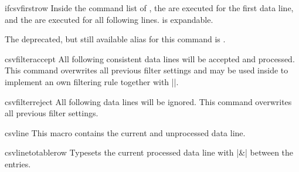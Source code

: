 \documentclass[a4paper,11pt]{ltxdoc}
\begin{document}
\clearpage

\begin{docCommand}[doc updated=2021-06-28]{ifcsvfirstrow}{}
  Inside the command list of , the 
  are executed for the first data line, and the 
  are executed for all following lines.
   is expandable.
\begin{dispExample}
\end{dispExample}
  The deprecated, but still available alias for this command is
  .
\end{docCommand}

\medskip


\begin{docCommand}{csvfilteraccept}{}
  All following consistent data lines will be accepted and processed.
  This command overwrites all previous filter settings and may be used
  inside  to implement
  an own filtering rule together with |\csvfilterreject|.
\begin{dispExample}
\end{dispExample}
\end{docCommand}


\begin{docCommand}{csvfilterreject}{}
  All following data lines will be ignored.
  This command overwrites all previous filter settings.
\end{docCommand}


\begin{docCommand}{csvline}{}
  This macro contains the current and unprocessed data line.
\begin{dispExample}
\end{dispExample}
\end{docCommand}


\begin{docCommand}[doc updated=2016-07-01]{csvlinetotablerow}{}
  Typesets the current processed data line with |&| between the entries.
\end{docCommand}
\end{document}
